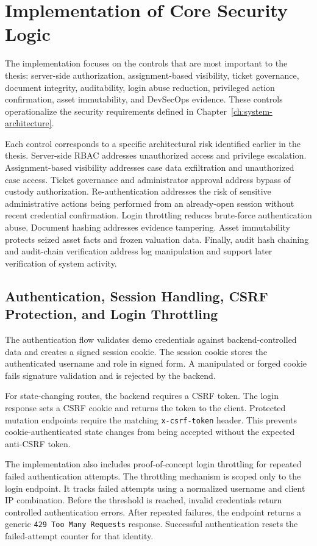 \documentclass[12pt,a4paper]{report}
\begin{document}
\section{Implementation of Core Security Logic}

The implementation focuses on the controls that are most important to the thesis: server-side authorization, assignment-based visibility, ticket governance, document integrity, auditability, login abuse reduction, privileged action confirmation, asset immutability, and DevSecOps evidence. These controls operationalize the security requirements defined in Chapter~\ref{ch:system-architecture}.

Each control corresponds to a specific architectural risk identified earlier in the thesis. Server-side RBAC addresses unauthorized access and privilege escalation. Assignment-based visibility addresses case data exfiltration and unauthorized case access. Ticket governance and administrator approval address bypass of custody authorization. Re-authentication addresses the risk of sensitive administrative actions being performed from an already-open session without recent credential confirmation. Login throttling reduces brute-force authentication abuse. Document hashing addresses evidence tampering. Asset immutability protects seized asset facts and frozen valuation data. Finally, audit hash chaining and audit-chain verification address log manipulation and support later verification of system activity.

\subsection{Authentication, Session Handling, CSRF Protection, and Login Throttling}

The authentication flow validates demo credentials against backend-controlled data and creates a signed session cookie. The session cookie stores the authenticated username and role in signed form. A manipulated or forged cookie fails signature validation and is rejected by the backend.

For state-changing routes, the backend requires a CSRF token. The login response sets a CSRF cookie and returns the token to the client. Protected mutation endpoints require the matching \texttt{x-csrf-token} header. This prevents cookie-authenticated state changes from being accepted without the expected anti-CSRF token.

The implementation also includes proof-of-concept login throttling for repeated failed authentication attempts. The throttling mechanism is scoped only to the login endpoint. It tracks failed attempts using a normalized username and client IP combination. Before the threshold is reached, invalid credentials return controlled authentication errors. After repeated failures, the endpoint returns a generic \texttt{429 Too Many Requests} response. Successful authentication resets the failed-attempt counter for that identity.
\end{document}
